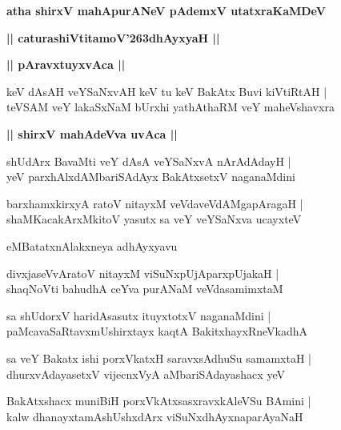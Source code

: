 \documentclass[twoside,12pt,openright]{book}
\def\S{\char'263}
\newcounter{shloka}[chapter]
\def\uvaca#1{\centerline{{\large\textbf{#1}}}}
\begin{document}
\begin{center}
{\LARGE\bfseries atha shirxV mahApurANeV pAdemxV utatxraKaMDeV}
\end{center}

\begin{center}
{\LARGE\bfseries || caturashiVtitamoV\S dhAyxyaH || }
\end{center}

\uvaca{|| pAravxtuyxvAca ||}

\begin{shloka}%
keV dAsAH veYSaNxvAH keV tu keV BakAtx Buvi kiVtiRtAH |\\
teVSAM veY lakaSxNaM bUrxhi yathAthaRM veY maheVshavxra
\end{shloka}

\uvaca{|| shirxV mahAdeVva uvAca ||}

\begin{shloka}%
shUdArx BavaMti veY dAsA veYSaNxvA nArAdAdayH |\\
yeV parxhAlxdAMbariSAdAyx BakAtxsetxV naganaMdini 
\end{shloka}

\begin{shloka}%
barxhamxkirxyA ratoV nitayxM veVdaveVdAMgapAragaH |\\
shaMKacakArxMkitoV yasutx sa veY veYSaNxva ucayxteV 
\end{shloka}

\begin{center}
eMBatatxnAlakxneya adhAyxyavu
\end{center}

\begin{shloka}%
divxjaseVvAratoV nitayxM viSuNxpUjAparxpUjakaH |\\
shaqNoVti bahudhA ceYva purANaM veVdasamimxtaM 
\end{shloka}

\begin{shloka}%
sa shUdorxV haridAsasutx ituyxtotxV naganaMdini |\\
paMcavaSaRtavxmUshirxtayx kaqtA BakitxhayxRneVkadhA
\end{shloka}

\begin{shloka}%
sa veY Bakatx ishi porxVkatxH saravxsAdhuSu samamxtaH |\\
dhurxvAdayasetxV vijecnxVyA aMbariSAdayashacx yeV 
\end{shloka}

\begin{shloka}%
BakAtxshacx muniBiH porxVkAtxsasxravxkAleVSu BAmini |\\
kalw dhanayxtamAshUshxdArx viSuNxdhAyxnaparAyaNaH 
\end{shloka}
\end{document}
